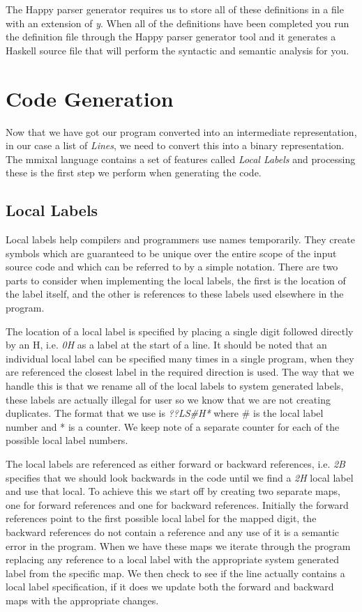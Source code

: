 \documentclass[a4paper,11pt]{report}
\begin{document}
The Happy parser generator requires us to store all of these definitions in a file with an extension of \textit{y}. When all of the definitions have been completed you run the definition file through the Happy parser generator tool and it generates a Haskell source file that will perform the syntactic and semantic analysis for you.

\section{Code Generation}
Now that we have got our program converted into an intermediate representation, in our case a list of \textit{Lines}, we need to convert this into a binary representation. The mmixal language contains a set of features called \textit{Local Labels} and processing these is the first step we perform when generating the code.
\subsection{Local Labels}
Local labels help compilers and programmers use names temporarily. They create symbols which are guaranteed to be unique over the entire scope of the input source code and which can be referred to by a simple notation. There are two parts to consider when implementing the local labels, the first is the location of the label itself, and the other is references to these labels used elsewhere in the program.

The location of a local label is specified by placing a single digit followed directly by an H, i.e. \textit{0H} as a label at the start of a line. It should be noted that an individual local label can be specified many times in a single program, when they are referenced the closest label in the required direction is used. The way that we handle this is that we rename all of the local labels to system generated labels, these labels are actually illegal for user so we know that we are not creating duplicates. The format that we use is \textit{??LS\#H*} where \# is the local label number and * is a counter. We keep note of a separate counter for each of the possible local label numbers.

The local labels are referenced as either forward or backward references, i.e. \textit{2B} specifies that we should look backwards in the code until we find a \textit{2H} local label and use that local. To achieve this we start off by creating two separate maps, one for forward references and one for backward references. Initially the forward references point to the first possible local label for the mapped digit, the backward references do not contain a reference and any use of it is a semantic error in the program. When we have these maps we iterate through the program replacing any reference to a local label with the appropriate system generated label from the specific map. We then check to see if the line actually contains a local label specification, if it does we update both the forward and backward maps with the appropriate changes. 
\end{document}
